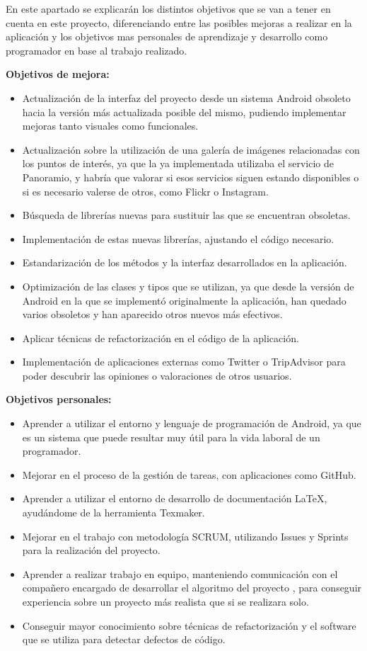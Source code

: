 
En este apartado se explicarán los distintos objetivos que se van a tener en cuenta en este proyecto, diferenciando entre las posibles mejoras a realizar en la aplicación y los objetivos mas personales de aprendizaje y desarrollo como programador en base al trabajo realizado.

\textbf{Objetivos de mejora:}
\begin{itemize}
\item Actualización de la interfaz del proyecto desde un sistema Android obsoleto hacia la versión más actualizada posible del mismo, pudiendo implementar mejoras tanto visuales como funcionales.
\item Actualización sobre la utilización de una galería de imágenes relacionadas con los puntos de interés, ya que la ya implementada utilizaba el servicio de Panoramio, y habría que valorar si esos servicios siguen estando disponibles o si es necesario valerse de otros, como Flickr o Instagram.
\item Búsqueda de librerías nuevas para sustituir las que se encuentran obsoletas.
\item Implementación de estas nuevas librerías, ajustando el código necesario.
\item Estandarización de los métodos y la interfaz desarrollados en la aplicación.
\item Optimización de las clases y tipos que se utilizan, ya que desde la versión de Android en la que se implementó originalmente la aplicación, han quedado varios obsoletos y han aparecido otros nuevos más efectivos.
\item Aplicar técnicas de refactorización en el código de la aplicación.
\item Implementación de aplicaciones externas como Twitter o TripAdvisor para poder descubrir las opiniones o valoraciones de otros usuarios.
\end{itemize}

\textbf{Objetivos personales:}
\begin{itemize}
\item Aprender a utilizar el entorno y lenguaje de programación de Android, ya que es un sistema que puede resultar muy útil para la vida laboral de un programador.
\item Mejorar en el proceso de la gestión de tareas, con aplicaciones como GitHub.
\item Aprender a utilizar el entorno de desarrollo de documentación LaTeX, ayudándome de la herramienta Texmaker.
\item Mejorar en el trabajo con metodología SCRUM, utilizando Issues y Sprints para la realización del proyecto.
\item Aprender a realizar trabajo en equipo, manteniendo comunicación con el compañero encargado de desarrollar el algoritmo del proyecto \cite{tfg2}, para conseguir experiencia sobre un proyecto más realista que si se realizara solo.
\item Conseguir mayor conocimiento sobre técnicas de refactorización y el software que se utiliza para detectar defectos de código.
\end{itemize}

